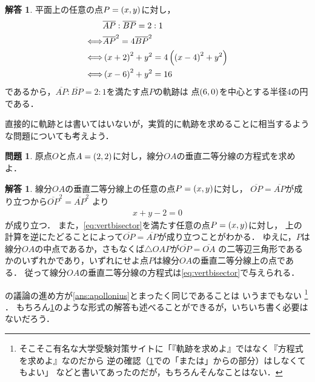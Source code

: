 \documentclass[11pt,a4paper]{ltjsarticle}
\newcommand*{\length}[1]{\overline{#1}}
\newcommand*{\equivalent}{\Longleftrightarrow}
\newcommand*{\coord}[1]{\paren{#1}}
\theoremstyle{definition}
\newtheorem{que}[dfn]{問題}
\newtheorem{ans}[dfn]{解答}
\begin{document}
\begin{ans} \label{ans:aplloniusomit}
	平面上の任意の点$P = \coord{x,y}$に対し，
	\begin{align*}
		            & \length{AP} : \length{BP} = 2 : 1                       \\
		\equivalent & \length{AP}^2 = 4 \length{BP}^2                         \\
		\equivalent & \paren{x + 2}^2 + y^2 = 4 \paren{\paren{x - 4}^2 + y^2} \\
		\equivalent & \paren{x - 6}^2 + y^2 = 16
	\end{align*}
	であるから，$\length{AP} : \length{BP} = 2 : 1$を満たす点$P$の軌跡は
	点$\coord{6, 0}$を中心とする半径$4$の円である．
\end{ans}


直接的に軌跡とは書いてはいないが，実質的に軌跡を求めることに相当するような問題についても考えよう．

\begin{que} \label{que:vertbisector}
	原点$O$と点$A = \coord{2, 2}$に対し，線分$OA$の垂直二等分線の方程式を求めよ．
\end{que}

\begin{ans} \label{ans:vertbisector}
	線分$OA$の垂直二等分線上の任意の点$P = \coord{x, y}$に対し，
	$\length{OP} = \length{AP}$が成り立つから$\length{OP}^2 = \length{AP}^2$
	より
	\begin{align}
		x + y - 2 = 0
		\label{eq:vertbisector}
	\end{align}
	が成り立つ．
	また，\cref{eq:vertbisector}を満たす任意の点$P = \coord{x, y}$に対し，
	上の計算を逆にたどることによって$\length{OP} = \length{AP}$が成り立つことがわかる．
	ゆえに，$P$は線分$OA$の中点であるか，さもなくば$\triangle OAP$が$\length{OP} = \length{OA}$
	の二等辺三角形であるかのいずれかであり，いずれにせよ点$P$は線分$OA$の垂直二等分線上の点である．
	従って線分$OA$の垂直二等分線の方程式は\cref{eq:vertbisector}で与えられる．
\end{ans}

の議論の進め方が\cref{ans:apollonius}とまったく同じであることは
いうまでもない%
\footnote{%
	そこそこ有名な大学受験対策サイトに「『軌跡を求めよ』ではなく『方程式を求めよ』なのだから
	逆の確認（\cref{ans:vertbisector}での「または」からの部分）はしなくてもよい」
	などと書いてあったのだが，もちろんそんなことはない．
}%
．
もちろん\cref{ans:aplloniusomit}のような形式の解答も述べることができるが，いちいち書く必要はないだろう．
\end{document}

